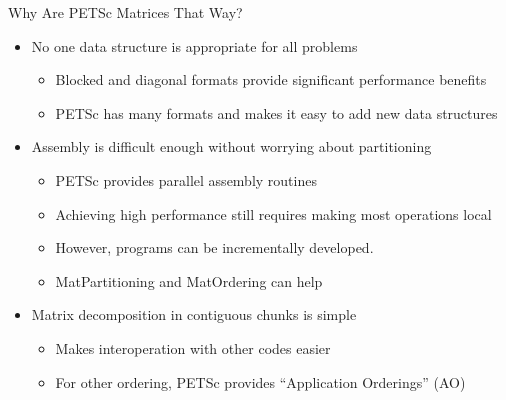 \begin{frame}{Why Are PETSc Matrices That Way?}

\begin{itemize}
  \item No one data structure is appropriate for all problems
  \begin{itemize}
    \item Blocked and diagonal formats provide significant performance benefits
    \item PETSc has many formats and makes it easy to add new data structures
  \end{itemize}

  \item Assembly is difficult enough without worrying about partitioning
  \begin{itemize}
    \item PETSc provides parallel assembly routines
    \item Achieving high performance still requires making most operations local
    \item However, programs can be incrementally developed.
    \item {\kb MatPartitioning} and {\kb MatOrdering} can help
  \end{itemize}

  \item Matrix decomposition in contiguous chunks is simple
  \begin{itemize}
    \item Makes interoperation with other codes easier
    \item For other ordering, PETSc provides ``Application Orderings'' (AO)
  \end{itemize}
\end{itemize}

\end{frame}
